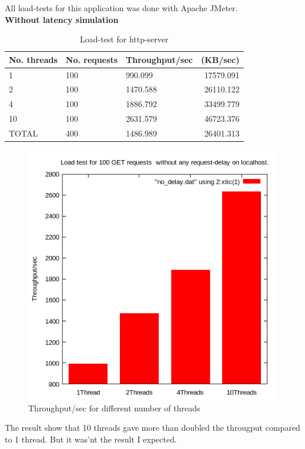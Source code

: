 \documentclass[a4paper, 11pt]{article}
\begin{document}
All load-tests for this application was done with Apache JMeter. \\
\textbf{Without latency simulation}
\begin{table}[H]
\centering
\label{Load-test for http-server}
\begin{tabular}{|l|l|l|r|}
\hline
\textbf{No. threads}  & \textbf{No. requests}  & \textbf{Throughput/sec} & \textbf{(KB/sec)} \\ \hline
1 & 100 & 990.099 & 17579.091 \\ \hline
2 & 100 & 1470.588 & 26110.122 \\ \hline
4 & 100 & 1886.792 & 33499.779 \\ \hline
10 & 100 & 2631.579 & 46723.376 \\ \hline
TOTAL & 400 & 1486.989 & 26401.313 \\ \hline
\end{tabular}
\caption{Load-test for http-server}
\end{table}
\begin{figure}[H]
\includegraphics[scale=0.7]{no_delay.png}
\caption{Throughput/sec for different number of threads}
\end{figure}
The result show that 10 threads gave more than doubled the througput compared to 1 thread. But it was'nt the result I expected. \\
\end{document}
